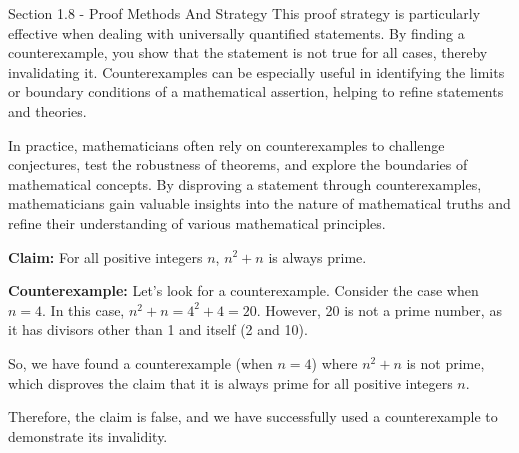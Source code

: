 \begin{notes}{Section 1.8 - Proof Methods And Strategy}
    This proof strategy is particularly effective when dealing with universally quantified statements. By finding a counterexample, you show that the statement is not true for all cases, thereby invalidating it. Counterexamples 
    can be especially useful in identifying the limits or boundary conditions of a mathematical assertion, helping to refine statements and theories.

    In practice, mathematicians often rely on counterexamples to challenge conjectures, test the robustness of theorems, and explore the boundaries of mathematical concepts. By disproving a statement through counterexamples, 
    mathematicians gain valuable insights into the nature of mathematical truths and refine their understanding of various mathematical principles.

    \begin{Highlight}
        \textbf{Claim:} For all positive integers \(n\), \(n^2 + n\) is always prime.
    
    
        \textbf{Counterexample:} Let's look for a counterexample. Consider the case when \(n = 4\). In this case, \(n^2 + n = 4^2 + 4 = 20\). However, 20 is not a prime number, as it has divisors other than 1 and itself (2 and 10). 
    
        So, we have found a counterexample (when \(n = 4\)) where \(n^2 + n\) is not prime, which disproves the claim that it is always prime for all positive integers \(n\).
    
    
        Therefore, the claim is false, and we have successfully used a counterexample to demonstrate its invalidity.
    \end{Highlight}
    
\end{notes}